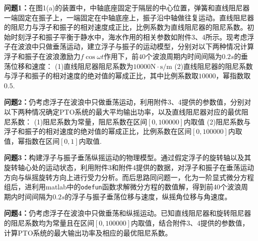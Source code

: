 \documentclass{article}
\numberwithin{equation}{subsection}
\begin{document}
\textbf{问题1：}在图1(a)的装置中，中轴底座固定于隔层的中心位置，弹簧和直线阻尼器一端固定在振子上，一端固定在中轴底座上，振子沿中轴做往复运动。直线阻尼器的阻尼力与浮子和振子的相对速度成正比，比例系数为直线阻尼器的阻尼系数。初始时刻浮子和振子平衡于静水中，海水作用的相关参数如附件3、4所示。现考虑浮子在波浪中只做垂荡运动，建立浮子与振子的运动模型，分别对以下两种情况计算浮子和振子在波浪激励力$f \cos \omega t$作用下，前$40$个波浪周期内时间间隔为$0.2s$的垂荡位移和速度：
(1)直线阻尼器阻尼系数为$10000\mathrm{N} \cdot \mathrm{s} / \mathrm{m}$
(2)直线阻尼器的阻尼系数与浮子和振子的相对速度的绝对值的幂成正比，其中比例系数取$10000$，幂指数取$0.5$.
    
\textbf{问题2：}仍考虑浮子在波浪中只做垂荡运动，利用附件3、4提供的参数值，分别对以下两种情况确定PTO系统的最大平均输出功率，以及直线阻尼器对应的最优阻尼系数：
(1)阻尼系数为常量，阻尼系数在区间$[0,100000]$内取值
(2)阻尼系数与浮子和振子的相对速度的绝对值的幂成正比，比例系数在区间$[0,100000]$内取值，幂指数在区间$[0,1]$内取值.

\textbf{问题3：}构建浮子与振子垂荡纵摇运动的物理模型。通过假定浮子的旋转轴以及其旋转轴心处的运动状态，利用附件3和附件4提供的数据，对浮子和振子在垂荡运动方向与纵摇旋转方向上进行受力分析。而后思路同问题一，化为一阶显式微分方程组后，进利用matlab中的\verb|odefun|函数求解微分方程的数值解，得到前40个波浪周期内时间间隔为$0.2s$的浮子与振子垂荡位移与速度，纵摇角位移与角速度。

\textbf{问题4：}仍考虑浮子在波浪中只做垂荡和纵摇运动。已知直线阻尼器和旋转阻尼器的阻尼系数均为常量且在区间$[0,100000]$内取值，结合附件3、4提供的参数值，计算PTO系统的最大输出功率及相应的最优阻尼系数。



\end{document}
